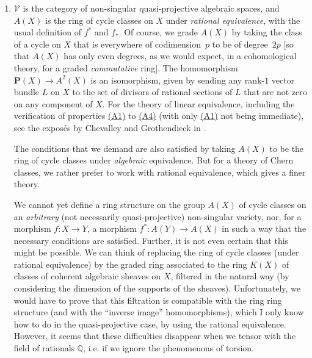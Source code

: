 \documentclass{article}
\renewcommand{\cal}[1]{{\mathcal{#1}}}
\newcommand{\PP}{\mathbf{P}}
\newcommand{\oldpage}[1]{\marginpar{\footnotesize$\Big\vert$ \textit{p.~#1}}}
\begin{document}
\begin{enumerate}
  \item
    $\cal{V}$ is the category of non-singular quasi-projective algebraic spaces, and $A(X)$ is the ring of cycle classes on $X$ under \emph{rational equivalence}, with the usual definition of $f^*$ and $f_*$.
    Of course, we grade $A(X)$ by taking the class of a cycle on $X$ that is everywhere of codimension~$p$ to be of degree~$2p$ [so that $A(X)$ has only even degrees, as we would expect, in a cohomological theory, for a graded \emph{commutative} ring].
    The homomorphism $\PP(X)\to A^2(X)$ is an isomorphism, given by sending any rank-$1$ vector bundle $L$ on $X$ to the set of divisors of rational sections of $L$ that are not zero on any component of $X$.
    For the theory of linear equivalence, including the verification of properties \hyperref[axiomA1]{(A1)} to \hyperref[axiomA4]{(A4)} (with only \hyperref[axiomA1]{(A1)} not being immediate), see the expos\'{e}s by Chevalley and Grothendieck in \cite{4}.

    The conditions that we demand are also satisfied by taking $A(X)$ to be the ring of cycle classes under \emph{algebraic} equivalence.
    But for a theory
\oldpage{143}
    of Chern classes, we rather prefer to work with rational equivalence, which gives a finer theory.

    We cannot yet define a ring structure on the group $A(X)$ of cycle classes on an \emph{arbitrary} (not necessarily quasi-projective) non-singular variety, nor, for a morphism $f\colon X\to Y$, a morphism $f^*\colon A(Y)\to A(X)$ in such a way that the necessary conditions are satisfied.
    Further, it is not even certain that this might be possible.
    We can think of replacing the ring of cycle classes (under rational equivalence) by the graded ring associated to the ring $K(X)$ of classes of coherent algebraic sheaves on $X$, filtered in the natural way (by considering the dimension of the supports of the sheaves).
    Unfortunately, we would have to prove that this filtration is compatible with the ring ring structure (and with the ``inverse image'' homomorphisms), which I only know how to do in the quasi-projective case, by using the rational equivalence.
    However, it seems that these difficulties disappear when we tensor with the field of rationals $\mathbb{Q}$, i.e. if we ignore the phenomenons of torsion.


\end{enumerate}
\end{document}

